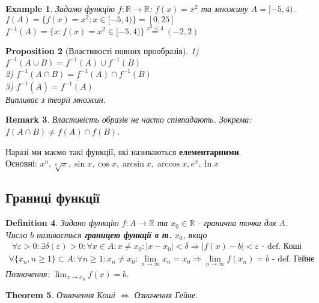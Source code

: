 \documentclass[a4paper, 14pt]{article}
\theoremstyle{theoremdd}
\newtheorem{theorem}{Theorem}[subsection]
\theoremstyle{theoremdd}
\newtheorem{definition}[theorem]{Definition}
\theoremstyle{theoremdd}
\theoremstyle{theoremdd}
\newtheorem{example}[theorem]{Example}
\theoremstyle{theoremdd}
\newtheorem{proposition}[theorem]{Proposition}
\theoremstyle{theoremdd}
\newtheorem{remark}[theorem]{Remark}
\theoremstyle{theoremdd}
\theoremstyle{theoremdd}
\begin{document}
	\begin{example} Задамо функцію $f: \mathbb{R} \to \mathbb{R}$: $f(x) = x^2$ та множину $A = [-5, 4)$.\\
	$f(A) = \{f(x) = x^2: x \in [-5, 4) \} = [0, 25]$\\
	$f^{-1}(A) = \{x: f(x) = x^2 \in [-5, 4) \} \overset{x^2 < 4}{=} (-2, 2)$
	\end{example}

	\begin{proposition}[Властивості повних прообразів]
	1) $f^{-1}(A \cup B) = f^{-1}(A) \cup f^{-1}(B)$\\
	2) $f^{-1}(A \cap B) = f^{-1}(A) \cap f^{-1}(B)$\\
	3) $f^{-1}(\overline{A}) = \overline{f^{-1}(A)}$\\
	\textit{Випливає з теорії множин.}
	\end{proposition}
	
	\begin{remark}
	Властивість образів не часто співпадають. Зокрема: $f(A \cap B) \neq f(A) \cap f(B)$.
	\end{remark}
	
	Наразі ми маємо такі функції, які називаються \textbf{елементарними}.\\
	Основні: $x^n, \sqrt[n]{x}, \sin x, \cos x, \arcsin x, \arccos x, e^x, \ln x$
	
	\subsection{Границі функції}
	\begin{definition}
	Задано функцію $f: A \to \mathbb{R}$ та $x_0 \in \mathbb{R}$ - гранична точка для $A$.\\
	Число $b$ називається \textbf{границею функції в т.} $x_0$, якщо
	\begin{align*}
	\forall \varepsilon > 0: \exists \delta(\varepsilon) > 0: \forall x \in A: x \neq x_0: |x-x_0|<\delta \Rightarrow |f(x)-b|<\varepsilon \textrm{ - def. Коші}
	\end{align*}
	\begin{align*}
	\forall \{x_n, n \geq 1\}\subset A: \forall n \geq 1: x_n \neq x_0: \lim_{n \to \infty} x_n = x_0 \Rightarrow \lim_{n \to \infty} f(x_n) = b \textrm{ - def. Гейне}
	\end{align*}
	Позначення: $\displaystyle \lim_{x \to x_0} f(x) = b$.
	\end{definition}
	
	\begin{theorem}
	Означення Коші $\iff$ Означення Гейне.
	\end{theorem}
	
\end{document}
